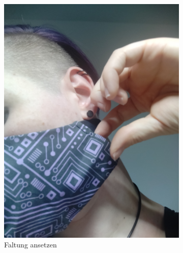 \documentclass[12pt,parskip=full]{scrartcl}
\begin{document}
\begin{figure}[hp]
    \vspace{0.5cm}
    \centering
    \begin{subfigure}{0.48\textwidth}
        \centering
        \includegraphics[width = \linewidth]{Pictures/11_Folding/Folding1.jpg}
        \caption{Faltung ansetzen}
        \label{Folding1}
    \end{subfigure}
    \begin{subfigure}{0.48\textwidth}
        \centering

\end{subfigure}
\end{figure}
\end{document}
